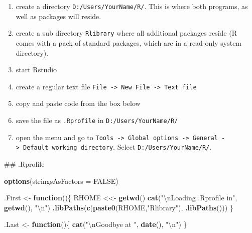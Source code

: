 \documentclass[]{svmono}
\newenvironment{Shaded}{\begin{snugshade}}{\end{snugshade}}
\newcommand{\KeywordTok}[1]{\textcolor[rgb]{0.13,0.29,0.53}{\textbf{#1}}}
\newcommand{\DataTypeTok}[1]{\textcolor[rgb]{0.13,0.29,0.53}{#1}}
\newcommand{\CharTok}[1]{\textcolor[rgb]{0.31,0.60,0.02}{#1}}
\newcommand{\StringTok}[1]{\textcolor[rgb]{0.31,0.60,0.02}{#1}}
\newcommand{\OtherTok}[1]{\textcolor[rgb]{0.56,0.35,0.01}{#1}}
\newcommand{\ControlFlowTok}[1]{\textcolor[rgb]{0.13,0.29,0.53}{\textbf{#1}}}
\newcommand{\NormalTok}[1]{#1}
\providecommand{\tightlist}{%
  \setlength{\itemsep}{0pt}\setlength{\parskip}{0pt}}
\theoremstyle{definition}
\theoremstyle{definition}
\theoremstyle{definition}
\theoremstyle{remark}
\begin{document}
\begin{enumerate}
\def\labelenumi{\arabic{enumi}.}
\tightlist
\item
  create a directory \texttt{D:/Users/YourName/R/}. This is where both
  programs, as well as packages will reside.
\item
  create a sub directory \texttt{Rlibrary} where all additional packages
  reside (R comes with a pack of standard packages, which are in a
  read-only system directory).
\item
  start Rstudio
\item
  create a regular text file
  \texttt{File\ -\textgreater{}\ New\ File\ -\textgreater{}\ Text\ file}
\item
  copy and paste code from the box below
\item
  save the file as \texttt{.Rprofile} in \texttt{D:/Users/YourName/R/}
\item
  open the menu and go to
  \texttt{Tools\ -\textgreater{}\ Global\ options\ -\textgreater{}\ General\ -\textgreater{}\ Default\ working\ directory}.
  Select \texttt{D:/Users/YourName/R/}.
\end{enumerate}

\begin{Shaded}
\begin{Highlighting}[]
\NormalTok{## .Rprofile}

\KeywordTok{options}\NormalTok{(}\DataTypeTok{stringsAsFactors =} \OtherTok{FALSE}\NormalTok{)}

\NormalTok{.First <-}\StringTok{ }\ControlFlowTok{function}\NormalTok{()\{}
\NormalTok{  RHOME <<-}\StringTok{ }\KeywordTok{getwd}\NormalTok{()}
    \KeywordTok{cat}\NormalTok{(}\StringTok{"}\CharTok{\textbackslash{}n}\StringTok{Loading .Rprofile in"}\NormalTok{, }\KeywordTok{getwd}\NormalTok{(), }\StringTok{"}\CharTok{\textbackslash{}n}\StringTok{"}\NormalTok{)}
  \KeywordTok{.libPaths}\NormalTok{(}\KeywordTok{c}\NormalTok{(}\KeywordTok{paste0}\NormalTok{(RHOME,}\StringTok{"Rlibrary"}\NormalTok{), }\KeywordTok{.libPaths}\NormalTok{()))}
\NormalTok{\}}

\NormalTok{.Last <-}\StringTok{ }\ControlFlowTok{function}\NormalTok{()\{ }
  \KeywordTok{cat}\NormalTok{(}\StringTok{"}\CharTok{\textbackslash{}n}\StringTok{Goodbye at "}\NormalTok{, }\KeywordTok{date}\NormalTok{(), }\StringTok{"}\CharTok{\textbackslash{}n}\StringTok{"}\NormalTok{)}
\NormalTok{\}}
\end{Highlighting}
\end{Shaded}
\end{document}
